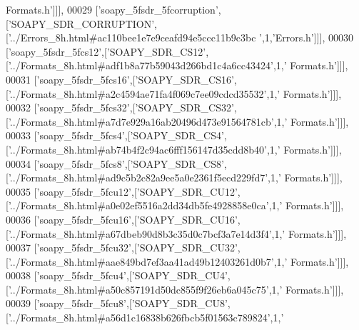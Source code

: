 \begin{DoxyCode}
{      Formats.h'}]]],
00029   [\textcolor{stringliteral}{'soapy\_5fsdr\_5fcorruption'},[\textcolor{stringliteral}{'SOAPY\_SDR\_CORRUPTION'},[\textcolor{stringliteral}{'../Errors\_8h.html#ac110bee1e7e9ceafd94e5ccc11b9c3bc
      '},1,\textcolor{stringliteral}{'Errors.h'}]]],
00030   [\textcolor{stringliteral}{'soapy\_5fsdr\_5fcs12'},[\textcolor{stringliteral}{'SOAPY\_SDR\_CS12'},[\textcolor{stringliteral}{'../Formats\_8h.html#adf1b8a77b59043d266bd1c4a6cc43424'},1,\textcolor{stringliteral}{'
      Formats.h'}]]],
00031   [\textcolor{stringliteral}{'soapy\_5fsdr\_5fcs16'},[\textcolor{stringliteral}{'SOAPY\_SDR\_CS16'},[\textcolor{stringliteral}{'../Formats\_8h.html#a2c4594ae71fa4f069c7ee09cdcd35532'},1,\textcolor{stringliteral}{'
      Formats.h'}]]],
00032   [\textcolor{stringliteral}{'soapy\_5fsdr\_5fcs32'},[\textcolor{stringliteral}{'SOAPY\_SDR\_CS32'},[\textcolor{stringliteral}{'../Formats\_8h.html#a7d7e929a16ab20496d473e91564781cb'},1,\textcolor{stringliteral}{'
      Formats.h'}]]],
00033   [\textcolor{stringliteral}{'soapy\_5fsdr\_5fcs4'},[\textcolor{stringliteral}{'SOAPY\_SDR\_CS4'},[\textcolor{stringliteral}{'../Formats\_8h.html#ab74b4f2c94ac6fff156147d35cdd8b40'},1,\textcolor{stringliteral}{'
      Formats.h'}]]],
00034   [\textcolor{stringliteral}{'soapy\_5fsdr\_5fcs8'},[\textcolor{stringliteral}{'SOAPY\_SDR\_CS8'},[\textcolor{stringliteral}{'../Formats\_8h.html#ad9c5b2c82a9ee5a0e2361f5ecd229fd7'},1,\textcolor{stringliteral}{'
      Formats.h'}]]],
00035   [\textcolor{stringliteral}{'soapy\_5fsdr\_5fcu12'},[\textcolor{stringliteral}{'SOAPY\_SDR\_CU12'},[\textcolor{stringliteral}{'../Formats\_8h.html#a0e02ef5516a2dd34db5fe4928858e0ca'},1,\textcolor{stringliteral}{'
      Formats.h'}]]],
00036   [\textcolor{stringliteral}{'soapy\_5fsdr\_5fcu16'},[\textcolor{stringliteral}{'SOAPY\_SDR\_CU16'},[\textcolor{stringliteral}{'../Formats\_8h.html#a67dbeb90d8b3c35d0c7bcf3a7e14d3f4'},1,\textcolor{stringliteral}{'
      Formats.h'}]]],
00037   [\textcolor{stringliteral}{'soapy\_5fsdr\_5fcu32'},[\textcolor{stringliteral}{'SOAPY\_SDR\_CU32'},[\textcolor{stringliteral}{'../Formats\_8h.html#aae849bd7ef3aa41ad49b12403261d0b7'},1,\textcolor{stringliteral}{'
      Formats.h'}]]],
00038   [\textcolor{stringliteral}{'soapy\_5fsdr\_5fcu4'},[\textcolor{stringliteral}{'SOAPY\_SDR\_CU4'},[\textcolor{stringliteral}{'../Formats\_8h.html#a50c857191d50dc855f9f26eb6a045c75'},1,\textcolor{stringliteral}{'
      Formats.h'}]]],
00039   [\textcolor{stringliteral}{'soapy\_5fsdr\_5fcu8'},[\textcolor{stringliteral}{'SOAPY\_SDR\_CU8'},[\textcolor{stringliteral}{'../Formats\_8h.html#a56d1c16838b626fbcb5f01563c789824'},1,\textcolor{stringliteral}{'
}
\end{DoxyCode}
